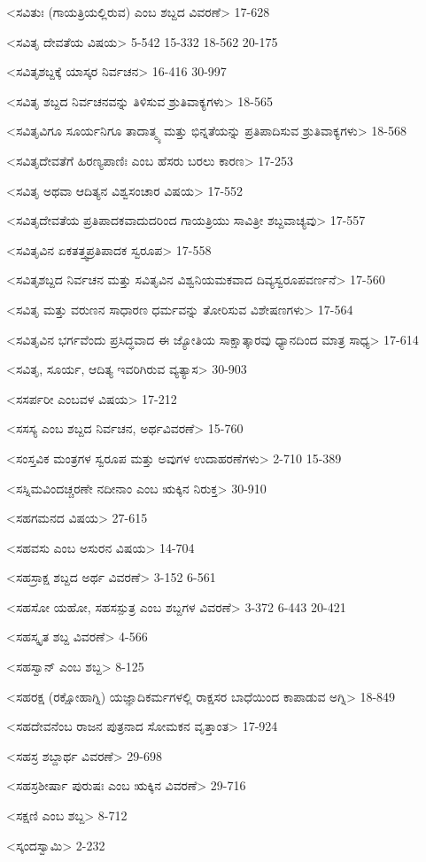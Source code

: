 <ಸವಿತುಃ (ಗಾಯತ್ರಿಯಲ್ಲಿರುವ) ಎಂಬ ಶಬ್ದದ ವಿವರಣೆ>
17-628

<ಸವಿತೃ ದೇವತೆಯ ವಿಷಯ>
5-542
15-332
18-562
20-175

<ಸವಿತೃಶಬ್ದಕ್ಕೆ ಯಾಸ್ಕರ ನಿರ್ವಚನ>
16-416
30-997

<ಸವಿತೃ ಶಬ್ದದ ನಿರ್ವಚನವನ್ನು ತಿಳಿಸುವ ಶ್ರುತಿವಾಕ್ಯಗಳು>
18-565

<ಸವಿತೃವಿಗೂ ಸೂರ್ಯನಿಗೂ ತಾದಾತ್ಮ್ಯ ಮತ್ತು ಭಿನ್ನತೆಯನ್ನು ಪ್ರತಿಪಾದಿಸುವ ಶ್ರುತಿವಾಕ್ಯಗಳು>
18-568

<ಸವಿತೃದೇವತೆಗೆ ಹಿರಣ್ಯಪಾಣಿಃ ಎಂಬ ಹೆಸರು ಬರಲು ಕಾರಣ>
17-253

<ಸವಿತೃ ಅಥವಾ ಆದಿತ್ಯನ ವಿಶ್ವಸಂಚಾರ ವಿಷಯ>
17-552

<ಸವಿತೃದೇವತೆಯ ಪ್ರತಿಪಾದಕವಾದುದರಿಂದ ಗಾಯತ್ರಿಯು ಸಾವಿತ್ರೀ ಶಬ್ದವಾಚ್ಯವು>
17-557

<ಸವಿತೃವಿನ ಏಕತತ್ತ್ವಪ್ರತಿಪಾದಕ ಸ್ವರೂಪ>
17-558

<ಸವಿತೃಶಬ್ದದ ನಿರ್ವಚನ ಮತ್ತು ಸವಿತೃವಿನ ವಿಶ್ವನಿಯಮಕವಾದ ದಿವ್ಯಸ್ವರೂಪವರ್ಣನೆ>
17-560

<ಸವಿತೃ ಮತ್ತು ವರುಣನ ಸಾಧಾರಣ ಧರ್ಮವನ್ನು ತೋರಿಸುವ ವಿಶೇಷಣಗಳು>
17-564

<ಸವಿತೃವಿನ ಭರ್ಗವೆಂದು ಪ್ರಸಿದ್ಧವಾದ ಈ ಜ್ಯೋತಿಯ ಸಾಕ್ಷಾತ್ಕಾರವು ಧ್ಯಾನದಿಂದ ಮಾತ್ರ ಸಾಧ್ಯ>
17-614

<ಸವಿತೃ, ಸೂರ್ಯ, ಆದಿತ್ಯ ಇವರಿಗಿರುವ ವ್ಯತ್ಯಾಸ>
30-903

<ಸಸರ್ಪರೀ ಎಂಬವಳ ವಿಷಯ>
17-212

<ಸಸಸ್ಯ ಎಂಬ ಶಬ್ದದ ನಿರ್ವಚನ, ಅರ್ಥವಿವರಣೆ>
15-760

<ಸಂಸ್ತವಿಕ ಮಂತ್ರಗಳ ಸ್ವರೂಪ ಮತ್ತು ಅವುಗಳ ಉದಾಹರಣೆಗಳು>
2-710
15-389

<ಸಸ್ನಿಮವಿಂದಚ್ಚರಣೇ ನದೀನಾಂ ಎಂಬ ಋಕ್ಕಿನ ನಿರುಕ್ತ>
30-910

<ಸಹಗಮನದ ವಿಷಯ>
27-615

<ಸಹವಸು ಎಂಬ ಅಸುರನ ವಿಷಯ>
14-704

<ಸಹಸ್ರಾಕ್ಷ ಶಬ್ದದ ಅರ್ಥ ವಿವರಣೆ>
3-152
6-561

<ಸಹಸೋ ಯಹೋ, ಸಹಸಸ್ಪುತ್ರ ಎಂಬ ಶಬ್ದಗಳ ವಿವರಣೆ>
3-372
6-443
20-421

<ಸಹಸ್ಕೃತ ಶಬ್ದ ವಿವರಣೆ>
4-566

<ಸಹಸ್ವಾನ್‍ ಎಂಬ ಶಬ್ದ>
8-125

<ಸಹರಕ್ಷ (ರಕ್ಷೋಹಾಗ್ನಿ) ಯಜ್ಞಾದಿಕರ್ಮಗಳಲ್ಲಿ ರಾಕ್ಷಸರ ಬಾಧೆಯಿಂದ ಕಾಪಾಡುವ ಅಗ್ನಿ>
18-849

<ಸಹದೇವನೆಂಬ ರಾಜನ ಪುತ್ರನಾದ ಸೋಮಕನ ವೃತ್ತಾಂತ>
17-924

<ಸಹಸ್ರ ಶಬ್ದಾರ್ಥ ವಿವರಣೆ>
29-698

<ಸಹಸ್ರಶೀರ್ಷಾ ಪುರುಷಃ ಎಂಬ ಋಕ್ಕಿನ ವಿವರಣೆ>
29-716

<ಸಕ್ಷಣಿ ಎಂಬ ಶಬ್ದ>
8-712

<ಸ್ಕಂದಸ್ವಾಮಿ>
2-232

